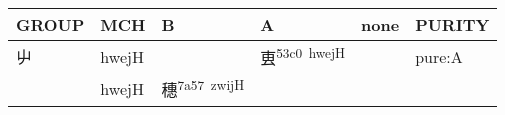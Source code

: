 \documentclass[14pt,a4paper]{scrartcl}
\begin{document}
\begin{longtable}[c]{@{}llllll@{}}
\toprule
\begin{minipage}[b]{0.14\columnwidth}\raggedright\strut
GROUP
\strut\end{minipage} &
\begin{minipage}[b]{0.14\columnwidth}\raggedright\strut
MCH
\strut\end{minipage} &
\begin{minipage}[b]{0.14\columnwidth}\raggedright\strut
B
\strut\end{minipage} &
\begin{minipage}[b]{0.14\columnwidth}\raggedright\strut
A
\strut\end{minipage} &
\begin{minipage}[b]{0.14\columnwidth}\raggedright\strut
none
\strut\end{minipage} &
\begin{minipage}[b]{0.14\columnwidth}\raggedright\strut
PURITY
\strut\end{minipage}\tabularnewline
\midrule
\endhead
\begin{minipage}[t]{0.14\columnwidth}\raggedright\strut
屮
\strut\end{minipage} &
\begin{minipage}[t]{0.14\columnwidth}\raggedright\strut
hwejH
\strut\end{minipage} &
\begin{minipage}[t]{0.14\columnwidth}\raggedright\strut
\strut\end{minipage} &
\begin{minipage}[t]{0.14\columnwidth}\raggedright\strut
叀\textsuperscript{53c0~hwejH}
\strut\end{minipage} &
\begin{minipage}[t]{0.14\columnwidth}\raggedright\strut
\strut\end{minipage} &
\begin{minipage}[t]{0.14\columnwidth}\raggedright\strut
pure:A
\strut\end{minipage}\tabularnewline
\begin{minipage}[t]{0.14\columnwidth}\raggedright\strut
𥝩
\strut\end{minipage} &
\begin{minipage}[t]{0.14\columnwidth}\raggedright\strut
hwejH
\strut\end{minipage} &
\begin{minipage}[t]{0.14\columnwidth}\raggedright\strut
穗\textsuperscript{7a57~zwijH}
\strut\end{minipage} &

\end{longtable}
\end{document}
